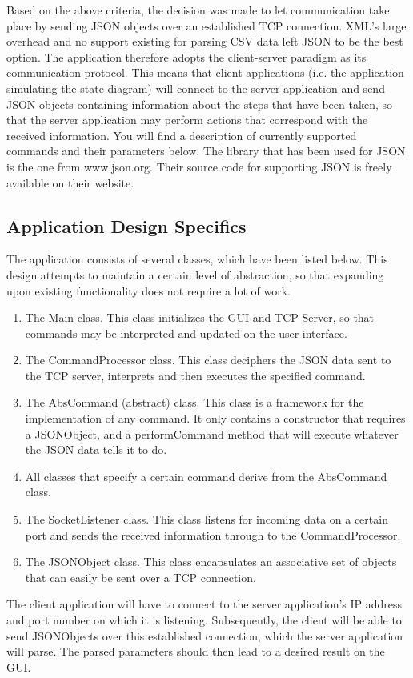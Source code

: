 \documentclass[11pt,a4paper]{article}
\begin{document}
Based on the above criteria, the decision was made to let communication take place by sending JSON objects over an established TCP connection. XML's large overhead and no support existing for parsing CSV data left JSON to be the best option. The application therefore adopts the client-server paradigm as its communication protocol. This means that client applications (i.e. the application simulating the state diagram) will connect to the server application and send JSON objects containing information about the steps that have been taken, so that the server application may perform actions that correspond with the received information. You will find a description of currently supported commands and their parameters below.
The library that has been used for JSON is the one from www.json.org. Their source code for supporting JSON is freely available on their website.
\subsection{Application Design Specifics}
The application consists of several classes, which have been listed below. This design attempts to maintain a certain level of abstraction, so that expanding upon existing functionality does not require a lot of work.
\begin{enumerate}
\item The Main class. This class initializes the GUI and TCP Server, so that commands may be interpreted and updated on the user interface.
\item The CommandProcessor class. This class deciphers the JSON data sent to the TCP server, interprets and then executes the specified command.
\item The AbsCommand (abstract) class. This class is a framework for the implementation of any command. It only contains a constructor that requires a JSONObject, and a performCommand method that will execute whatever the JSON data tells it to do.
\item All classes that specify a certain command derive from the AbsCommand class.
\item The SocketListener class. This class listens for incoming data on a certain port and sends the received information through to the CommandProcessor.
\item The JSONObject class. This class encapsulates an associative set of objects that can easily be sent over a TCP connection.
\end{enumerate}
The client application will have to connect to the server application's IP address and port number on which it is listening. Subsequently, the client will be able to send JSONObjects over this established connection, which the server application will parse. The parsed parameters should then lead to a desired result on the GUI.
\end{document}
